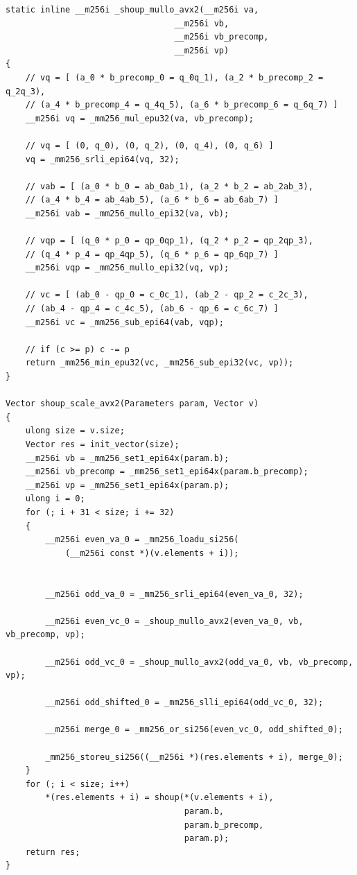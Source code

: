 \documentclass{article}
\begin{document}
\begin{lstlisting}[caption = Auxiliary Function of Shoup's Modular Reduction]
static inline __m256i _shoup_mullo_avx2(__m256i va,
                                  __m256i vb,
                                  __m256i vb_precomp,
                                  __m256i vp)
{
    // vq = [ (a_0 * b_precomp_0 = q_0q_1), (a_2 * b_precomp_2 = q_2q_3),
    // (a_4 * b_precomp_4 = q_4q_5), (a_6 * b_precomp_6 = q_6q_7) ]
    __m256i vq = _mm256_mul_epu32(va, vb_precomp);

    // vq = [ (0, q_0), (0, q_2), (0, q_4), (0, q_6) ]
    vq = _mm256_srli_epi64(vq, 32);

    // vab = [ (a_0 * b_0 = ab_0ab_1), (a_2 * b_2 = ab_2ab_3),
    // (a_4 * b_4 = ab_4ab_5), (a_6 * b_6 = ab_6ab_7) ]
    __m256i vab = _mm256_mullo_epi32(va, vb);

    // vqp = [ (q_0 * p_0 = qp_0qp_1), (q_2 * p_2 = qp_2qp_3),
    // (q_4 * p_4 = qp_4qp_5), (q_6 * p_6 = qp_6qp_7) ]
    __m256i vqp = _mm256_mullo_epi32(vq, vp);

    // vc = [ (ab_0 - qp_0 = c_0c_1), (ab_2 - qp_2 = c_2c_3),
    // (ab_4 - qp_4 = c_4c_5), (ab_6 - qp_6 = c_6c_7) ]
    __m256i vc = _mm256_sub_epi64(vab, vqp);

    // if (c >= p) c -= p
    return _mm256_min_epu32(vc, _mm256_sub_epi32(vc, vp));
}

Vector shoup_scale_avx2(Parameters param, Vector v)
{
    ulong size = v.size;
    Vector res = init_vector(size);
    __m256i vb = _mm256_set1_epi64x(param.b);
    __m256i vb_precomp = _mm256_set1_epi64x(param.b_precomp);
    __m256i vp = _mm256_set1_epi64x(param.p);
    ulong i = 0;
    for (; i + 31 < size; i += 32)
    {
        __m256i even_va_0 = _mm256_loadu_si256(
            (__m256i const *)(v.elements + i));


        __m256i odd_va_0 = _mm256_srli_epi64(even_va_0, 32);

        __m256i even_vc_0 = _shoup_mullo_avx2(even_va_0, vb, vb_precomp, vp);

        __m256i odd_vc_0 = _shoup_mullo_avx2(odd_va_0, vb, vb_precomp, vp);

        __m256i odd_shifted_0 = _mm256_slli_epi64(odd_vc_0, 32);

        __m256i merge_0 = _mm256_or_si256(even_vc_0, odd_shifted_0);

        _mm256_storeu_si256((__m256i *)(res.elements + i), merge_0);
    }
    for (; i < size; i++)
        *(res.elements + i) = shoup(*(v.elements + i),
                                    param.b,
                                    param.b_precomp,
                                    param.p);
    return res;
}
\end{lstlisting}
\end{document}
